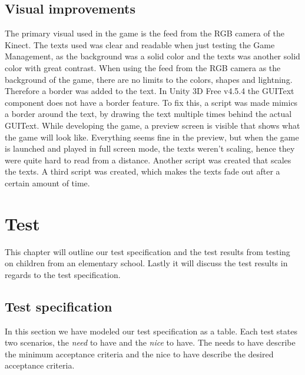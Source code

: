 \documentclass[11pt]{report}
\begin{document}
\section{Visual improvements}
The primary visual used in the game is the feed from the RGB camera of the Kinect. The texts used was clear and readable when just testing the Game Management, as the background was a solid color and the texts was another solid color with great contrast. When using the feed from the RGB camera as the background of the game, there are no limits to the colors, shapes and lightning. Therefore a border was added to the text. In Unity 3D Free v4.5.4 the GUIText component does not have a border feature. To fix this, a script was made mimics a border around the text, by drawing the text multiple times behind the actual GUIText. While developing the game, a preview screen is visible that shows what the game will look like. Everything seems fine in the preview, but when the game is launched and played in full screen mode, the texts weren't scaling, hence they were quite hard to read from a distance. Another script was created that scales the texts. A third script was created, which makes the texts fade out after a certain amount of time.

\chapter{Test}
This chapter will outline our test specification and the test results from testing on children from an elementary school. Lastly it will discuss the test results in regards to the test specification.

\section{Test specification}
In this section we have modeled our test specification as a table. Each test states two scenarios, the \emph{need} to have and the \emph{nice} to have. The needs to have describe the minimum acceptance criteria and the nice to have describe the desired acceptance criteria.
\end{document}
